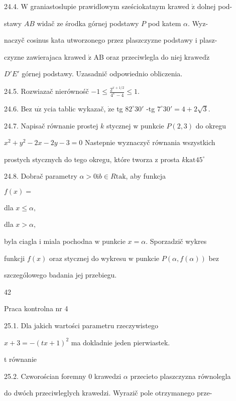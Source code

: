 \documentclass[a4paper,12pt]{article}
\begin{document}
24.4. $\mathrm{W}$ graniastoslupie prawidlowym sześciokatnym krawed $\acute{\mathrm{z}}$ dolnej pod-

stawy $AB$ widač ze środka górnej podstawy $P$ pod katem $\alpha$. Wyz-

naczyč cosinus kata utworzonego przez plaszczyzne podstawy $\mathrm{i}$ plasz-

czyzne zawierajaca krawed $\acute{\mathrm{z}}$ AB oraz przeciwlegla do niej $\mathrm{k}\mathrm{r}\mathrm{a}\mathrm{w}\mathrm{e}\mathrm{d}\acute{\mathrm{z}}$

$D'E'$ górnej podstawy. Uzasadnič odpowiednio obliczenia.

24.5. Rozwiazač nierównośč $-1\displaystyle \leq\frac{2^{x+1/2}}{4^{x}-4}\leq 1.$

24.6. Bez $\mathrm{u}\dot{\mathrm{z}}$ ycia tablic wykazač, $\dot{\mathrm{z}}\mathrm{e}$ tg $82^{\circ}30'$ -tg $7^{\circ}30'=4+2\sqrt{3}.$

24.7. Napisač równanie prostej $k$ stycznej $\mathrm{w}$ punkcie $P(2,3)$ do okregu

$x^{2}+y^{2}-2x-2y-3=0$ Nastepnie wyznaczyč równania wszystkich

prostych stycznych do tego okregu, które tworza $\mathrm{z}$ prosta $k\mathrm{k}\mathrm{a}\mathrm{t}45^{\circ}$

24.8. Dobrač parametry $\alpha>0 \mathrm{i} b\in R \mathrm{t}\mathrm{a}\mathrm{k}$, aby funkcja

$f(x)=$

dla $x\leq\alpha,$

dla $x>\alpha,$

byla ciagla $\mathrm{i}$ miala pochodna $\mathrm{w}$ punkcie $x =\alpha$. Sporzadzič wykres

funkcji $f(x)$ oraz stycznej do wykresu $\mathrm{w}$ punkcie $P(\alpha,f(\alpha))$ bez

szczególowego badania jej przebiegu.





42

Praca kontrolna nr 4

25.1. Dla jakich wartości parametru rzeczywistego

$x+3=-(tx+1)^{2}$ ma dokladnie jeden pierwiastek.

t równanie

25.2. Czworościan foremny $0$ krawedzi $\alpha$ przecieto plaszczyzna równolegla

do dwóch przeciwleglych krawedzi. Wyrazič pole otrzymanego prze-
\end{document}
